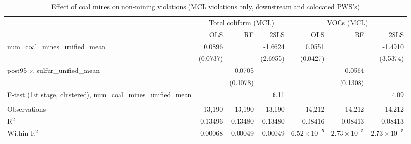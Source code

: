 
\begin{table}[htbp]
   
   \caption{\label{2sls_dwnstrmcolocate_nonminevio_mcl} Effect of coal mines on non-mining violations (MCL violations only, downstream and colocated PWS's)}
   \bigskip
   
   \centering
   
   \begin{adjustbox}{width = \textwidth, center}
      
      
      \begin{tabular}{lrrrrrr}
         \toprule
         
          & \multicolumn{3}{c}{Total coliform (MCL)} & \multicolumn{3}{c}{VOCs (MCL)}\\
         
                                                                            & OLS      & RF       & 2SLS     & OLS                   & RF                    & 2SLS\\  
         
         \midrule 
         num\_coal\_mines\_unified\_mean                                    & 0.0896   &          & -1.6624  & 0.0551                &                       & -1.4910\\   
                                                                            & (0.0737) &          & (2.6955) & (0.0427)              &                       & (3.5374)\\   
         post95 $\times$ sulfur\_unified\_mean                              &          & 0.0705   &          &                       & 0.0564                &   \\   
                                                                            &          & (0.1078) &          &                       & (0.1308)              &   \\   
         
         F-test (1st stage, clustered), num\_coal\_mines\_unified\_mean     &          &          & 6.11     &                       &                       & 4.09\\  
         
          \\
         
         Observations                                                       & 13,190   & 13,190   & 13,190   & 14,212                & 14,212                & 14,212\\  
         R$^2$                                                              & 0.13496  & 0.13480  & 0.13480  & 0.08416               & 0.08413               & 0.08413\\  
         Within R$^2$                                                       & 0.00068  & 0.00049  & 0.00049  & $6.52\times 10^{-5}$  & $2.73\times 10^{-5}$  & $2.73\times 10^{-5}$\\   
         

\end{tabular}
\end{adjustbox}
\end{table}
